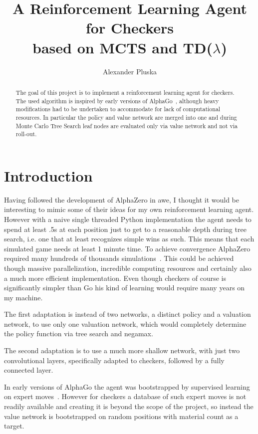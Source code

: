\documentclass[a4paper,12pt]{article}
\title{A Reinforcement Learning Agent for Checkers\\based on MCTS and TD($\lambda$)}
\author{Alexander Pluska}
\theoremstyle{definition}
\theoremstyle{definition}
\theoremstyle{definition}
\theoremstyle{definition}
\theoremstyle{definition}
\theoremstyle{definition}
\begin{document}
	
	\maketitle
	
	\begin{abstract}
		The goal of this project is to implement a reinforcement learning agent for checkers. The used algorithm is inspired by early versions of AlphaGo~\cite{silver2016mastering}, although heavy modifications had to be undertaken to accommodate for lack of computational resources. In particular the policy and value network are merged into one and during Monte Carlo Tree Search leaf nodes are evaluated only via value network and not via roll-out.
	\end{abstract}
	
	\section{Introduction}
	
	Having followed the development of AlphaZero in awe, I thought it would be interesting to mimic some of their ideas for my own reinforcement learning agent. However with a naive single threaded Python implementation the agent needs to spend at least .5s at each position just to get to a reasonable depth during tree search, i.e. one that at least recognizes simple wins as such. This means that each simulated game needs at least 1 minute time. To achieve convergence AlphaZero required many hundreds of thousands simulations~\cite{silver2018general}. This could be achieved though massive parallelization, incredible computing resources and certainly also a much more efficient implementation. Even though checkers of course is significantly simpler than Go his kind of learning would require many years on my machine.
	
	The first adaptation is instead of two networks, a distinct policy and a valuation network, to use only one valuation network, which would completely determine the policy function via tree search and negamax.
	
	The second adaptation is to use a much more shallow network, with just two convolutional layers, specifically adapted to checkers, followed by a fully connected layer.
	
	In early versions of AlphaGo the agent was bootstrapped by supervised learning on expert moves~\cite{silver2016mastering}. However for checkers a database of such expert moves is not readily available and creating it is beyond the scope of the project, so instead the value network is bootstrapped on random positions with material count as a target.
	
\end{document}
